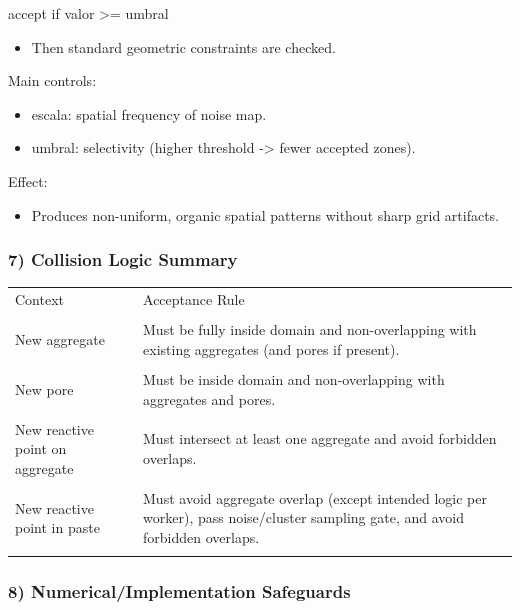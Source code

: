 ﻿\documentclass[11pt,a4paper]{article}
\begin{document}
accept if valor >= umbral

\begin{itemize}
\item Then standard geometric constraints are checked.
\end{itemize}

Main controls:

\begin{itemize}
\item escala: spatial frequency of noise map.
\item umbral: selectivity (higher threshold -> fewer accepted zones).
\end{itemize}

Effect:

\begin{itemize}
\item Produces non-uniform, organic spatial patterns without sharp grid artifacts.
\end{itemize}

\subsubsection*{7) Collision Logic Summary}

\begin{longtable}{|p{}|p{}|}
\hline
Context & Acceptance Rule \\\\
\hline
New aggregate & Must be fully inside domain and non-overlapping with existing aggregates (and pores if present). \\\\
\hline
New pore & Must be inside domain and non-overlapping with aggregates and pores. \\\\
\hline
New reactive point on aggregate & Must intersect at least one aggregate and avoid forbidden overlaps. \\\\
\hline
New reactive point in paste & Must avoid aggregate overlap (except intended logic per worker), pass noise/cluster sampling gate, and avoid forbidden overlaps. \\\\
\hline
\end{longtable}


\subsubsection*{8) Numerical/Implementation Safeguards}
\end{document}
